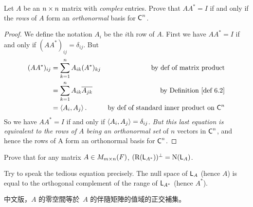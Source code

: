 \begin{exercise} \label{exercise 6.2.11}
Let \(A\) be an \(n \times n\) matrix with \emph{complex} entries.
Prove that \(A A^* = I\) if and only if the \emph{rows} of \(A\) form an \emph{orthonormal} basis for \(\textsf{C}^n\).
\end{exercise}

\begin{proof}
We define the notation \(A_i\) be the \(i\)th row of \(A\).
First we have \(A A^* = I\) if and only if \((A A^*)_{ij} = \delta_{ij}\).
But
\begin{align*}
    (A A^*)_{ij} & = \sum_{k = 1}^n A_{ik} (A^{*})_{kj} & \text{by def of matrix product} \\
        & = \sum_{k = 1}^n A_{ik} \conjugatet{A_{jk}} & \text{by \DEF{6.2}} \\
        & = \LG A_i, A_j \RG. & \text{by def of standard inner product on \(\SET{C}^n\)}
\end{align*}
So we have \(A A^* = I\) if and only if \(\left< A_i, A_j \right> = \delta_{ij}\).
\emph{But this last equation is equivalent to the rows of \(A\) being an orthonormal set} of \(n\) vectors in \(\textsf{C}^n\), and hence the rows of A form an orthonormal basis for \(\textsf{C}^n\).
\end{proof}

\begin{exercise} \label{exercise 6.2.12}
Prove that for any matrix \(A \in M_{m \times n}(F)\), \((\mathrm{R}(\textsf{L}_{A^*}))^{\perp} = \mathrm{N}(\textsf{L}_A)\).
\end{exercise}

\begin{note}
Try to speak the tedious equation precisely.
The null space of \(\textsf{L}_A\) (hence \(A\)) is equal to the orthogonal complement of the range of \(\textsf{L}_{A^*}\) (hence \(A^*\)).
\end{note}

\begin{note}
中文版，\(A\) 的零空間等於\ \(A\) 的伴隨矩陣的值域的正交補集。
\end{note}

